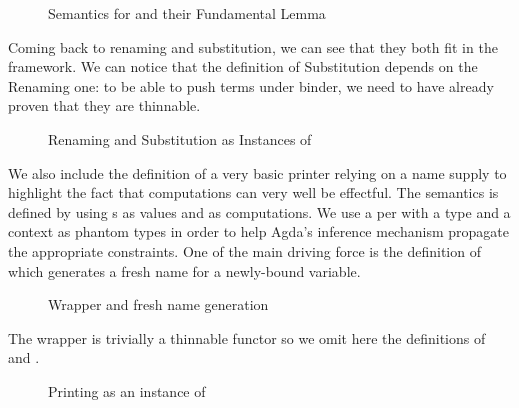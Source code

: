 \begin{figure}[h]
\begin{minipage}{0.45\textwidth}
\end{minipage}\hspace{2em}
\begin{minipage}{0.45\textwidth}
\end{minipage}
\caption{Semantics for  and their Fundamental Lemma}
\end{figure}

Coming back to renaming and substitution, we can see that they both fit
in the  framework. We can notice that the definition of Substitution
depends on the Renaming one: to be able to push terms under binder, we
need to have already proven that they are thinnable.

\begin{figure}[h]
\begin{minipage}{0.45\textwidth}
\end{minipage}
\begin{minipage}{0.45\textwidth}
\end{minipage}
\caption{Renaming and Substitution as Instances of }
\end{figure}

We also include the definition of a very basic printer relying on a
name supply to highlight the fact that computations can very well be
effectful. The  semantics is defined by using s
as values and  as computations. We use a
per with a type and a context as phantom types in order to
help Agda's inference mechanism propagate the appropriate constraints.
One of the main driving force is the definition of  which
generates a fresh name for a newly-bound variable.

\begin{figure}[h]
\caption{Wrapper and fresh name generation}
\end{figure}

The wrapper  is trivially a thinnable functor so we omit here
the definitions of  and .

\begin{figure}[h]
\caption{Printing as an instance of }
\end{figure}

